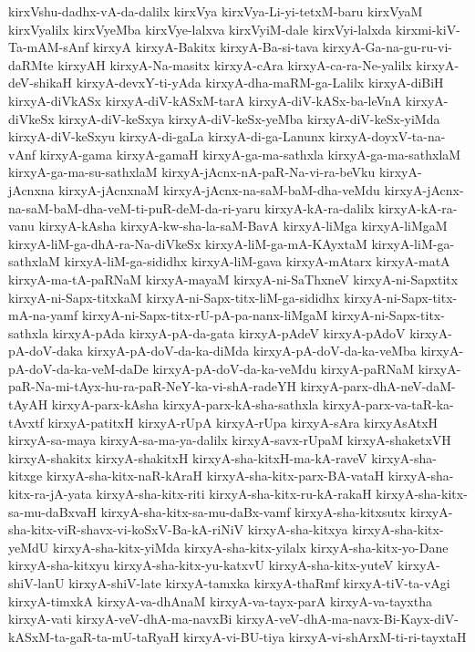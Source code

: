 {kirxVshu-dadhx-vA-da-dalilx
kirxVya
kirxVya-Li-yi-tetxM-baru
kirxVyaM
kirxVyalilx
kirxVyeMba
kirxVye-lalxva
kirxVyiM-dale
kirxVyi-lalxda
kirxmi-kiV-Ta-mAM-sAnf
kirxyA
kirxyA-Bakitx
kirxyA-Ba-si-tava
kirxyA-Ga-na-gu-ru-vi-daRMte
kirxyAH
kirxyA-Na-masitx
kirxyA-cAra
kirxyA-ca-ra-Ne-yalilx
kirxyA-deV-shikaH
kirxyA-devxY-ti-yAda
kirxyA-dha-maRM-ga-Lalilx
kirxyA-diBiH
kirxyA-diVkASx
kirxyA-diV-kASxM-tarA
kirxyA-diV-kASx-ba-leVnA
kirxyA-diVkeSx
kirxyA-diV-keSxya
kirxyA-diV-keSx-yeMba
kirxyA-diV-keSx-yiMda
kirxyA-diV-keSxyu
kirxyA-di-gaLa
kirxyA-di-ga-Lanunx
kirxyA-doyxV-ta-na-vAnf
kirxyA-gama
kirxyA-gamaH
kirxyA-ga-ma-sathxla
kirxyA-ga-ma-sathxlaM
kirxyA-ga-ma-su-sathxlaM
kirxyA-jAcnx-nA-paR-Na-vi-ra-beVku
kirxyA-jAcnxna
kirxyA-jAcnxnaM
kirxyA-jAcnx-na-saM-baM-dha-veMdu
kirxyA-jAcnx-na-saM-baM-dha-veM-ti-puR-deM-da-ri-yaru
kirxyA-kA-ra-dalilx
kirxyA-kA-ra-vanu
kirxyA-kAsha
kirxyA-kw-sha-la-saM-BavA
kirxyA-liMga
kirxyA-liMgaM
kirxyA-liM-ga-dhA-ra-Na-diVkeSx
kirxyA-liM-ga-mA-KAyxtaM
kirxyA-liM-ga-sathxlaM
kirxyA-liM-ga-sididhx
kirxyA-liM-gava
kirxyA-mAtarx
kirxyA-matA
kirxyA-ma-tA-paRNaM
kirxyA-mayaM
kirxyA-ni-SaThxneV
kirxyA-ni-Sapxtitx
kirxyA-ni-Sapx-titxkaM
kirxyA-ni-Sapx-titx-liM-ga-sididhx
kirxyA-ni-Sapx-titx-mA-na-yamf
kirxyA-ni-Sapx-titx-rU-pA-pa-nanx-liMgaM
kirxyA-ni-Sapx-titx-sathxla
kirxyA-pAda
kirxyA-pA-da-gata
kirxyA-pAdeV
kirxyA-pAdoV
kirxyA-pA-doV-daka
kirxyA-pA-doV-da-ka-diMda
kirxyA-pA-doV-da-ka-veMba
kirxyA-pA-doV-da-ka-veM-daDe
kirxyA-pA-doV-da-ka-veMdu
kirxyA-paRNaM
kirxyA-paR-Na-mi-tAyx-hu-ra-paR-NeY-ka-vi-shA-radeYH
kirxyA-parx-dhA-neV-daM-tAyAH
kirxyA-parx-kAsha
kirxyA-parx-kA-sha-sathxla
kirxyA-parx-va-taR-ka-tAvxtf
kirxyA-patitxH
kirxyA-rUpA
kirxyA-rUpa
kirxyA-sAra
kirxyAsAtxH
kirxyA-sa-maya
kirxyA-sa-ma-ya-dalilx
kirxyA-savx-rUpaM
kirxyA-shaketxVH
kirxyA-shakitx
kirxyA-shakitxH
kirxyA-sha-kitxH-ma-kA-raveV
kirxyA-sha-kitxge
kirxyA-sha-kitx-naR-kAraH
kirxyA-sha-kitx-parx-BA-vataH
kirxyA-sha-kitx-ra-jA-yata
kirxyA-sha-kitx-riti
kirxyA-sha-kitx-ru-kA-rakaH
kirxyA-sha-kitx-sa-mu-daBxvaH
kirxyA-sha-kitx-sa-mu-daBx-vamf
kirxyA-sha-kitxsutx
kirxyA-sha-kitx-viR-shavx-vi-koSxV-Ba-kA-riNiV
kirxyA-sha-kitxya
kirxyA-sha-kitx-yeMdU
kirxyA-sha-kitx-yiMda
kirxyA-sha-kitx-yilalx
kirxyA-sha-kitx-yo-Dane
kirxyA-sha-kitxyu
kirxyA-sha-kitx-yu-katxvU
kirxyA-sha-kitx-yuteV
kirxyA-shiV-lanU
kirxyA-shiV-late
kirxyA-tamxka
kirxyA-thaRmf
kirxyA-tiV-ta-vAgi
kirxyA-timxkA
kirxyA-va-dhAnaM
kirxyA-va-tayx-parA
kirxyA-va-tayxtha
kirxyA-vati
kirxyA-veV-dhA-ma-navxBi
kirxyA-veV-dhA-ma-navx-Bi-Kayx-diV-kASxM-ta-gaR-ta-mU-taRyaH
kirxyA-vi-BU-tiya
kirxyA-vi-shArxM-ti-ri-tayxtaH
}
